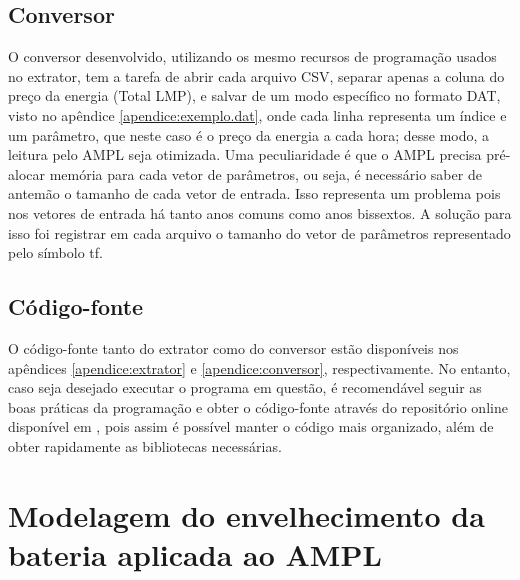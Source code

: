 \subsection{Conversor}
O conversor desenvolvido, utilizando os mesmo recursos de programação usados no extrator, tem a tarefa de abrir cada arquivo CSV, separar apenas a coluna do preço da energia (Total LMP), e salvar de um modo específico no formato DAT, visto no apêndice \ref{apendice:exemplo.dat}, onde cada linha representa um índice e um parâmetro, que neste caso é o preço da energia a cada hora; desse modo, a leitura pelo AMPL seja otimizada. Uma peculiaridade é que o AMPL precisa pré-alocar memória para cada vetor de parâmetros, ou seja, é necessário saber de antemão o tamanho de cada vetor de entrada. Isso representa um problema pois nos vetores de entrada há tanto anos comuns como anos bissextos. A solução para isso foi registrar em cada arquivo o tamanho do vetor de parâmetros representado pelo símbolo tf.

\subsection{Código-fonte}
O código-fonte tanto do extrator como do conversor estão disponíveis nos apêndices \ref{apendice:extrator} e \ref{apendice:conversor}, respectivamente. No entanto, caso seja desejado executar o programa em questão, é recomendável seguir as boas práticas da programação e obter o código-fonte através do repositório online disponível em \cite{bitbucket}, pois assim é possível manter o código mais organizado, além de obter rapidamente as bibliotecas necessárias.

\section{Modelagem do envelhecimento da bateria aplicada ao AMPL}
